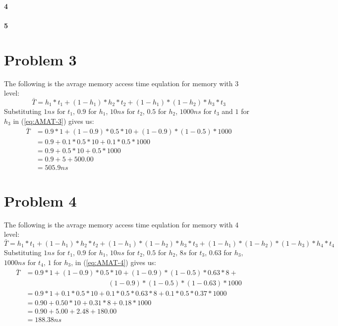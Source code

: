 \documentclass[11pt]{article}
\begin{document}
\paragraph{4}
\paragraph{5}
\section{Problem 3}
The following is the avrage memory access time equlation for
memory with 3 level:
\begin{equation}
	\label{eq:AMAT-3}
	\bar{T} = h_1 * t_1 + (1 - h_1) * h_2 * t_2 + (1 - h_1) * (1 - h_2) * h_3 * t_3
\end{equation}
Substituting $1ns$ for $t_1$, $0.9$ for $h_1$, $10ns$ for $t_2$, $0.5$ for $h_2$, $1000ns$ for $t_3$ and $1$ for $h_3$
in (\ref{eq:AMAT-3}) gives us:
\begin{align*}
	\bar{T} &= 0.9 * 1 + (1 - 0.9) * 0.5 * 10 + (1 - 0.9) * (1 - 0.5) * 1000\\
	&= 0.9 + 0.1 * 0.5 * 10 + 0.1 * 0.5 * 1000\\
	&= 0.9 + 0.5 * 10 + 0.5 * 1000\\
	&= 0.9 + 5 + 500.00\\
	&= 505.9ns
\end{align*}
\section{Problem 4}
The following is the avrage memory access time equlation for
memory with 4 level:
\begin{equation}
	\label{eq:AMAT-4}
	\bar{T} = h_1 * t_1 + (1 - h_1) * h_2 * t_2 + (1 - h_1) * (1 - h_2) * h_3 * t_3 + (1 - h_1) * (1 - h_2) * (1 - h_3) * h_4 * t_4
\end{equation}
Substituting $1ns$ for $t_1$, $0.9$ for $h_1$, $10ns$ for $t_2$, $0.5$ for $h_2$, $8s$ for $t_3$, $0.63$ for $h_3$,$1000ns$ for $t_4$, $1$ for $h_3$,
in (\ref{eq:AMAT-4}) gives us:
\begin{align*}
	\bar{T} &= 0.9 * 1 + (1 - 0.9) * 0.5 * 10 + (1 - 0.9) * (1 - 0.5) * 0.63 * 8 + \\
	&\qquad \phantom{= 0.1 * 1 + (1 - 0.9)} (1 - 0.9) * (1 - 0.5) * (1 - 0.63) * 1000 \\
	&= 0.9 * 1 + 0.1 * 0.5 * 10 + 0.1 * 0.5 * 0.63 * 8 + 0.1 * 0.5 * 0.37 * 1000 \\
	&= 0.90 + 0.50 * 10 + 0.31 * 8 + 0.18 * 1000 \\
	&= 0.90 + 5.00 + 2.48 + 180.00 \\
	&= 188.38ns
\end{align*}
\end{document}
